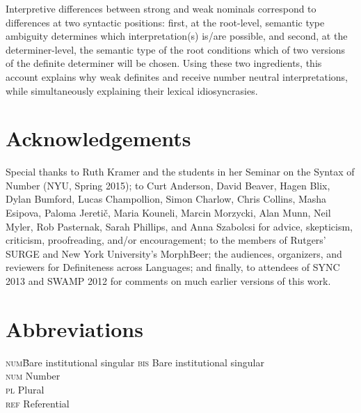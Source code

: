 \documentclass[output=paper,
modfonts
]{langscibook}
\begin{document}
Interpretive differences between strong and weak nominals correspond to differences at two syntactic positions: first, at the root-level, semantic type ambiguity determines which interpretation(s) is/are possible, and second, at the determiner-level, the semantic type of the root conditions which of two versions of the definite determiner will be chosen. Using these two ingredients, this account explains why weak definites and  receive number neutral interpretations, while simultaneously explaining their lexical idio\-syncrasies.

\section*{Acknowledgements}
Special thanks to Ruth Kramer and the students in her Seminar on the Syntax of Number (NYU, Spring 2015); to Curt Anderson, David Beaver, Hagen Blix, Dy\-lan Bumford, Lucas Champollion, Simon Charlow,  Chris Collins, Masha Esipova, Paloma Jereti{\v c}, Maria Kouneli, Marcin Morzycki, Alan Munn, Neil Myler, Rob Pasternak, Sarah Phillips, and Anna Szabolcsi for advice, skepticism, criticism, proofreading, and/or encouragement; to the members of Rutgers' SURGE and New York University's MorphBeer; the audiences, organizers, and reviewers for Definiteness across Languages; and finally, to attendees of SYNC 2013 and SWAMP 2012 for comments on much earlier versions of this work. 

\section*{Abbreviations}
\begin{multicols}{2}
\begin{tabbing}
    \textsc{num}\hspace{.5em}\= Bare institutional singular\kill
	\textsc{bis} \> Bare institutional singular \\
	\textsc{num} \> Number \\
	\textsc{pl} \> Plural \\
	\textsc{ref} \> Referential
\end{tabbing}
\end{multicols}

{\sloppy\printbibliography[heading=subbibliography,notkeyword=this]}
\end{document}
